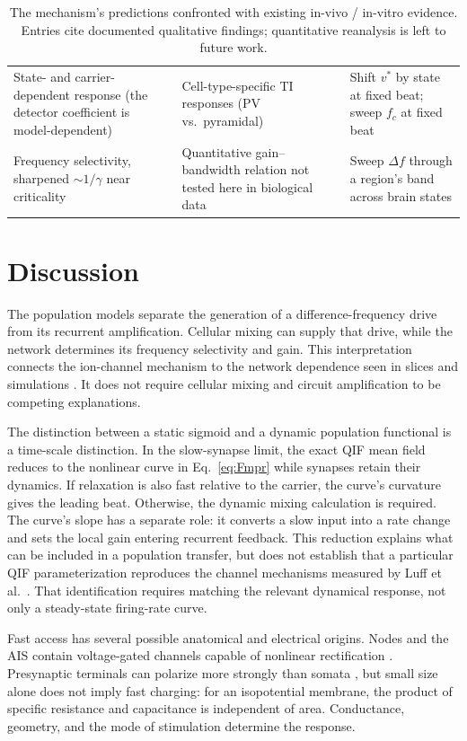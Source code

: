 \documentclass[11pt,a4paper]{article}
\begin{document}
\begin{table}[h]
\begin{tabular}{@{}>{\raggedright\arraybackslash}p{} >{\raggedright\arraybackslash}p{} >{\raggedright\arraybackslash}p{}@{}}
State- and carrier-dependent response (the detector coefficient is model-dependent) &
Cell-type-specific TI responses (PV vs.\ pyramidal) \cite{caldas2024} & Shift $v^*$ by
state at fixed beat; sweep $f_c$ at fixed beat \\
Frequency selectivity, sharpened $\sim1/\gamma$ near criticality & Quantitative
gain--bandwidth relation not tested here in biological data & Sweep $\Delta f$ through a region's band across brain
states \\
\bottomrule
\end{tabular}
\caption{The mechanism's predictions confronted with existing in-vivo / in-vitro evidence.
Entries cite documented qualitative findings; quantitative reanalysis is left to future
work.}\label{tab:predictions}
\end{table}

\section{Discussion}\label{sec:discussion}
The population models separate the generation of a difference-frequency drive from
its recurrent amplification. Cellular mixing can supply that drive, while the
network determines its frequency selectivity and gain. This interpretation connects
the ion-channel mechanism \cite{mirzakhalili2020,luff2024mixer} to the network
dependence seen in slices and simulations \cite{caldas2024,karimi2024,soroushi2025}.
It does not require cellular mixing and circuit amplification to be competing
explanations.

The distinction between a static sigmoid and a dynamic population functional is a
time-scale distinction. In the slow-synapse limit, the exact QIF mean field reduces
to the nonlinear curve in Eq.~\eqref{eq:Fmpr} while synapses retain their dynamics.
If relaxation is also fast relative to the carrier, the curve's curvature gives
the leading beat. Otherwise, the dynamic mixing calculation is required. The
curve's slope has a separate role: it converts a slow input into a rate change and
sets the local gain entering recurrent feedback. This reduction explains what
can be included in a population transfer, but does not establish that a particular
QIF parameterization reproduces the channel mechanisms measured by Luff et al.\
\cite{luff2024mixer}. That identification requires matching the relevant dynamical
response, not only a steady-state firing-rate curve.

Fast access has several possible anatomical and electrical origins. Nodes and the
AIS contain voltage-gated channels capable of nonlinear rectification
\cite{mirzakhalili2020,wang2023}. Presynaptic terminals can polarize more strongly
than somata \cite{rahman2013,aberra2023,chakraborty2018}, but small size alone does
not imply fast charging: for an isopotential membrane, the product of specific
resistance and capacitance is independent of area. Conductance, geometry, and the
mode of stimulation determine the response.
\end{document}
